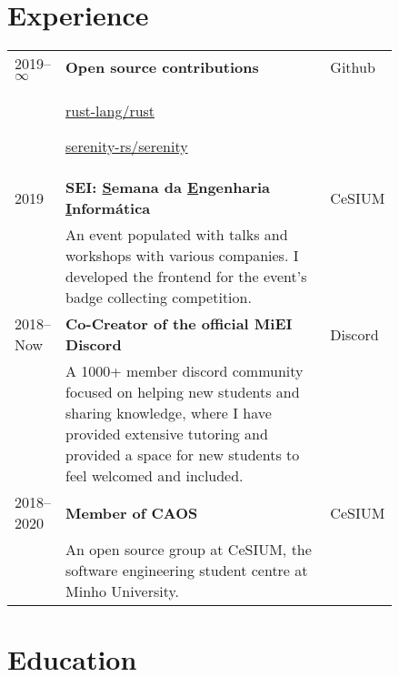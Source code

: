 \documentclass{article}
\begin{document}
\section{Experience}

\begin{tabular}{p{0.11\linewidth}p{0.73\linewidth}l}
    2019--$\infty$ & \textbf{Open source contributions} & Github\\ &
    \href{https://github.com/rust-lang/rust/pulls?q=author\%3Amendess+}
    {rust-lang/rust}

    \href{https://github.com/serenity-rs/serenity/pulls?q=author\%3Amendess+}
    {serenity-rs/serenity} &\\

    2019 & \textbf{SEI\@: \underline{S}emana da \underline{E}ngenharia
    \underline{I}nformática} & CeSIUM \\
    & An event populated with talks and workshops with various companies. I
    developed the frontend for the event's badge collecting competition. &\\

    2018--Now & \textbf{Co-Creator of the official MiEI
    Discord} & Discord\\
    & A 1000+ member discord community focused on helping new students and
    sharing knowledge, where I have provided extensive tutoring and provided a
    space for new students to feel welcomed and included. &\\

    2018--2020 & \textbf{Member of CAOS} & CeSIUM\\
    & An open source group at CeSIUM, the software engineering student centre at
    Minho University. &\\

\end{tabular}

\section{Education}
\end{document}
